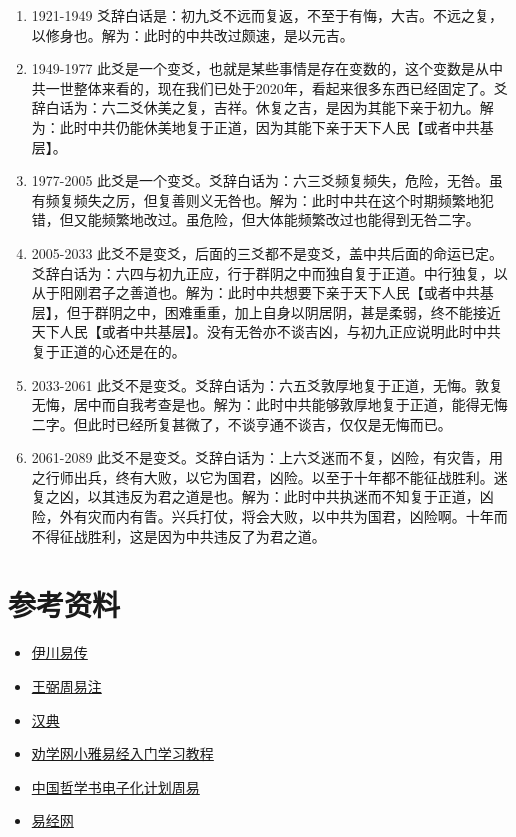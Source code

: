 \documentclass[12pt,oneside]{book}
\begin{document}
\begin{enumerate}
\item 1921-1949 爻辞白话是：初九爻不远而复返，不至于有悔，大吉。不远之复，以修身也。解为：此时的中共改过颇速，是以元吉。

\item 1949-1977 此爻是一个变爻，也就是某些事情是存在变数的，这个变数是从中共一世整体来看的，现在我们已处于2020年，看起来很多东西已经固定了。爻辞白话为：六二爻休美之复，吉祥。休复之吉，是因为其能下亲于初九。解为：此时中共仍能休美地复于正道，因为其能下亲于天下人民【或者中共基层】。

\item 1977-2005 此爻是一个变爻。爻辞白话为：六三爻频复频失，危险，无咎。虽有频复频失之厉，但复善则义无咎也。解为：此时中共在这个时期频繁地犯错，但又能频繁地改过。虽危险，但大体能频繁改过也能得到无咎二字。

\item 2005-2033 此爻不是变爻，后面的三爻都不是变爻，盖中共后面的命运已定。爻辞白话为：六四与初九正应，行于群阴之中而独自复于正道。中行独复，以从于阳刚君子之善道也。解为：此时中共想要下亲于天下人民【或者中共基层】，但于群阴之中，困难重重，加上自身以阴居阴，甚是柔弱，终不能接近天下人民【或者中共基层】。没有无咎亦不谈吉凶，与初九正应说明此时中共复于正道的心还是在的。

\item 2033-2061 此爻不是变爻。爻辞白话为：六五爻敦厚地复于正道，无悔。敦复无悔，居中而自我考查是也。解为：此时中共能够敦厚地复于正道，能得无悔二字。但此时已经所复甚微了，不谈亨通不谈吉，仅仅是无悔而已。

\item 2061-2089 此爻不是变爻。爻辞白话为：上六爻迷而不复，凶险，有灾眚，用之行师出兵，终有大败，以它为国君，凶险。以至于十年都不能征战胜利。迷复之凶，以其违反为君之道是也。解为：此时中共执迷而不知复于正道，凶险，外有灾而内有眚。兴兵打仗，将会大败，以中共为国君，凶险啊。十年而不得征战胜利，这是因为中共违反了为君之道。

\end{enumerate}

\chapter{参考资料}
\begin{itemize}
\item \href{https://www.eee-learning.com/article/897}{伊川易传}
\item \href{http://www.quanxue.cn/QT_MingXiang/ZhouYiZhuIndex.html}{王弼周易注}
\item \href{https://www.zdic.net/}{汉典}
\item \href{http://www.quanxue.cn/QT_XiaoYa/YiJingIndex.html}{劝学网小雅易经入门学习教程}
\item \href{https://ctext.org/book-of-changes/zhs}{中国哲学书电子化计划周易}
\item \href{http://www.xshiqi.com/}{易经网}
\end{itemize}
\end{document}
